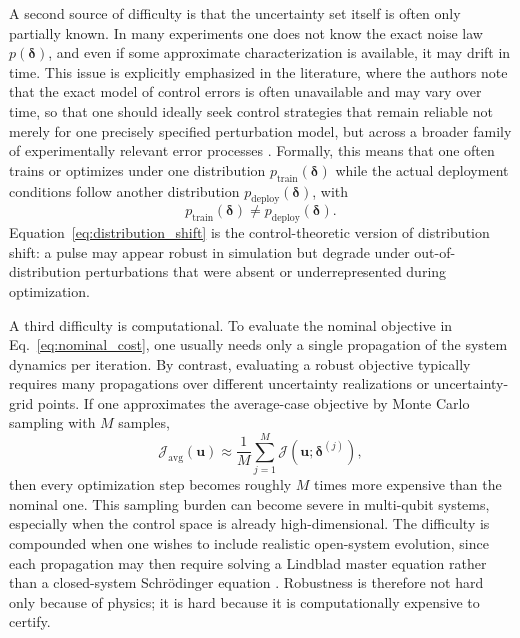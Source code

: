 A second source of difficulty is that the uncertainty set itself is often only partially known. In many experiments one does not know the exact noise law $p(\bm{\delta})$, and even if some approximate characterization is available, it may drift in time. This issue is explicitly emphasized in the literature, where the authors note that the exact model of control errors is often unavailable and may vary over time, so that one should ideally seek control strategies that remain reliable not merely for one precisely specified perturbation model, but across a broader family of experimentally relevant error processes \cite{Niu2019}. Formally, this means that one often trains or optimizes under one distribution $p_{\mathrm{train}}(\bm{\delta})$ while the actual deployment conditions follow another distribution $p_{\mathrm{deploy}}(\bm{\delta})$, with
\begin{equation}
p_{\mathrm{train}}(\bm{\delta})
\neq
p_{\mathrm{deploy}}(\bm{\delta}).
\label{eq:distribution_shift}
\end{equation}
Equation~\eqref{eq:distribution_shift} is the control-theoretic version of distribution shift: a pulse may appear robust in simulation but degrade under out-of-distribution perturbations that were absent or underrepresented during optimization.

A third difficulty is computational. To evaluate the nominal objective in Eq.~\eqref{eq:nominal_cost}, one usually needs only a single propagation of the system dynamics per iteration. By contrast, evaluating a robust objective typically requires many propagations over different uncertainty realizations or uncertainty-grid points. If one approximates the average-case objective by Monte Carlo sampling with $M$ samples,
\begin{equation}
\mathcal{J}_{\mathrm{avg}}(\bm{u})
\approx
\frac{1}{M}
\sum_{j=1}^{M}
\mathcal{J}(\bm{u};\bm{\delta}^{(j)}),
\label{eq:monte_carlo_robustness}
\end{equation}
then every optimization step becomes roughly $M$ times more expensive than the nominal one. This sampling burden can become severe in multi-qubit systems, especially when the control space is already high-dimensional. The difficulty is compounded when one wishes to include realistic open-system evolution, since each propagation may then require solving a Lindblad master equation rather than a closed-system Schr\"odinger equation \cite{Weidner2025,Propson2022,Goldschmidt2022}. Robustness is therefore not hard only because of physics; it is hard because it is computationally expensive to certify.

